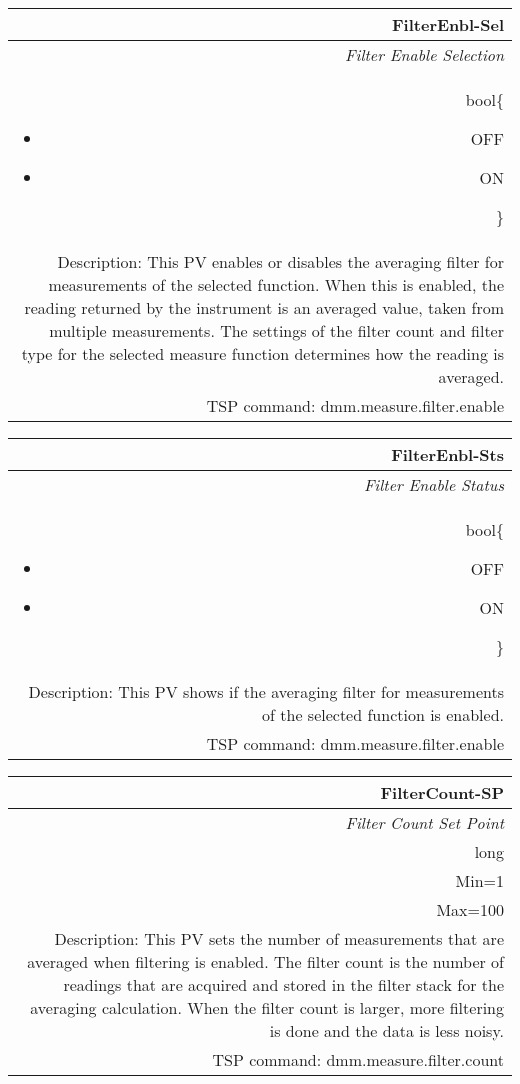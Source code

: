 \documentclass[openany]{article}
\begin{document}
		\begin{tabular}{N}
			\hline
			\bfseries FilterEnbl-Sel\label{pv:filterenbl-sel} \\ \hline
			\emph{Filter Enable Selection} \\
			bool\{\begin{itemize}[noitemsep]
				\item[] OFF
				\item[] ON
			\end{itemize}\} \\
			Description: This PV enables or disables the averaging filter for measurements of the selected function. When this is enabled, the reading returned by the instrument is an averaged value, taken from multiple measurements. The settings of the filter count and filter type for the selected measure function determines how the reading is averaged. \\
			TSP command: dmm.measure.filter.enable
		\end{tabular}

		\begin{tabular}{N}
			\hline
			\bfseries FilterEnbl-Sts\label{pv:filterenbl-sts} \\ \hline
			\emph{Filter Enable Status} \\
			bool\{\begin{itemize}[noitemsep]
				\item[] OFF
				\item[] ON
			\end{itemize}\} \\
			Description: This PV shows if the averaging filter for measurements of the selected function is enabled. \\
			TSP command: dmm.measure.filter.enable
		\end{tabular}

		\begin{tabular}{N}
			\hline
			\bfseries FilterCount-SP\label{pv:filtercount-sp} \\ \hline
			\emph{Filter Count Set Point} \\
			long \\
			Min=1 \\
			Max=100 \\
			Description: This PV sets the number of measurements that are averaged when filtering is enabled. The filter count is the number of readings that are acquired and stored in the filter stack for the averaging calculation. When the filter count is larger, more filtering is done and the data is less noisy. \\
			TSP command: dmm.measure.filter.count
		\end{tabular}
\end{document}
